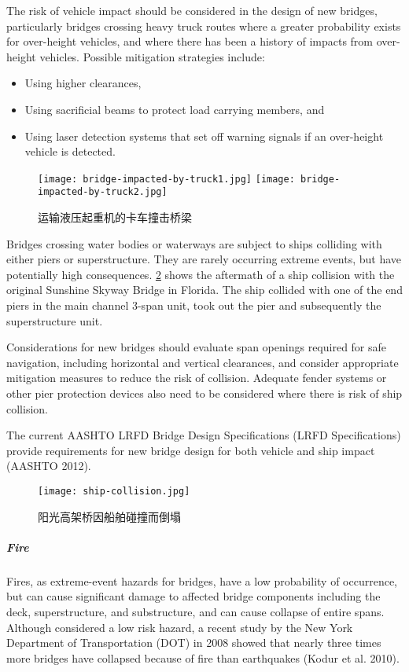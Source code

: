 The risk of vehicle impact should be considered in the design of new bridges, particularly bridges crossing heavy
truck routes where a greater probability exists for over-height vehicles, and where there has been a history of impacts
from over-height vehicles. Possible mitigation strategies include:
\begin{itemize}
  \item Using higher clearances,
  \item Using sacrificial beams to protect load carrying members, and
  \item Using laser detection systems that set off warning signals if an over-height vehicle is detected.
\end{itemize}

\begin{figure}
  \texttt{[image: bridge-impacted-by-truck1.jpg]}\hfill
  \texttt{[image: bridge-impacted-by-truck2.jpg]}
  \caption{运输液压起重机的卡车撞击桥梁}
  \label{fig:bridge-impacted-by-truck}
\end{figure}

Bridges crossing water bodies or waterways are subject to ships colliding with either piers or superstructure.
They are rarely occurring extreme events, but have potentially high consequences. \cref{fig:ship-collision} shows the aftermath
of a ship collision with the original Sunshine Skyway Bridge in Florida. The ship collided with one of the end piers
in the main channel 3-span unit, took out the pier and subsequently the superstructure unit.

Considerations for new bridges should evaluate span openings required for safe navigation, including horizontal
and vertical clearances, and consider appropriate mitigation measures to reduce the risk of collision. Adequate
fender systems or other pier protection devices also need to be considered where there is risk of ship collision.

The current AASHTO LRFD Bridge Design Specifications (LRFD Specifications) provide requirements for new bridge design for both vehicle and ship impact (AASHTO 2012).

\begin{figure}
  \texttt{[image: ship-collision.jpg]}
  \caption{阳光高架桥因船舶碰撞而倒塌}
  \label{fig:ship-collision}
\end{figure}

\subparagraph{Fire}
Fires, as extreme-event hazards for bridges, have a low probability of occurrence, but can cause significant
damage to affected bridge components including the deck, superstructure, and substructure, and can cause collapse of
entire spans. Although considered a low risk hazard, a recent study by the New York Department of Transportation
(DOT) in 2008 showed that nearly three times more bridges have collapsed because of fire than earthquakes (Kodur
et al. 2010).

